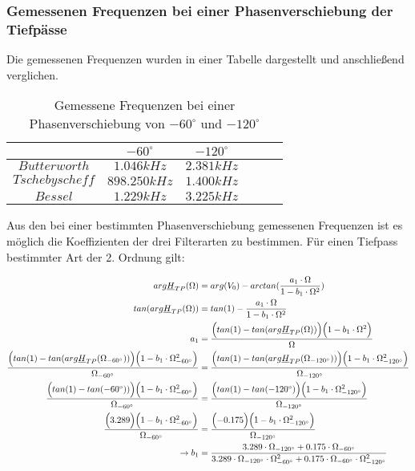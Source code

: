 \newpage

\subsubsection{Gemessenen Frequenzen bei einer Phasenverschiebung der Tiefpässe}
\noindent Die gemessenen Frequenzen wurden in einer Tabelle dargestellt und anschließend verglichen.

		\begin{table}[h]
			\centering
			\begin{tabular}{c|c|c|c|c|c}
				$ $             & $-60^\circ $ & $-120^\circ$  \\
				\hline		
				$Butterworth$   & $1.046kHz$   & $2.381kHz$    \\
				\hline
				$Tschebyscheff$ & $898.250kHz$ & $1.400kHz$    \\ 
				\hline
				$Bessel$        & $1.229kHz$   & $3.225kHz$    \\
			\end{tabular}
			\caption{Gemessene Frequenzen bei einer Phasenverschiebung von $-60^\circ$ und $-120^\circ$ }
			\label{tab:phasenverschiebung_hp_tp_vorausberechnung}
		\end{table}
		
\noindent Aus den bei einer bestimmten Phasenverschiebung gemessenen Frequenzen ist es möglich die Koeffizienten der drei Filterarten zu bestimmen. 
\noindent Für einen Tiefpass bestimmter Art der 2. Ordnung gilt:

\small{
\begin{alignat*}{2}
arg\underline{H}_{TP}(\Omega) &= arg(V_0) - arctan(\frac{a_1 \cdot \Omega}{1-b_1\cdot \Omega^2}) \\
tan(arg\underline{H}_{TP}(\Omega)) &= tan(1) - \frac{a_1 \cdot \Omega}{1-b_1\cdot \Omega^2}\\
a_1 &= \frac{\Bigl(tan(1) - tan(arg\underline{H}_{TP}(\Omega))\Bigr)\Bigl(1-b_1 \cdot \Omega^2\Bigr)}{\Omega}\\
\frac{\Bigl(tan(1) - tan(arg\underline{H}_{TP}(\Omega_{-60^\circ}))\Bigr)\Bigl(1-b_1 \cdot \Omega_{-60^\circ}^2\Bigr)}{\Omega_{-60^\circ}} &= \frac{\Bigl(tan(1) - tan(arg\underline{H}_{TP}(\Omega_{-120^\circ}))\Bigr)\Bigl(1-b_1 \cdot \Omega_{-120^\circ}^2\Bigr)}{\Omega_{-120^\circ}}\\
\frac{\Bigl(tan(1) - tan(-60^\circ))\Bigr)\Bigl(1-b_1 \cdot \Omega_{-60^\circ}^2\Bigr)}{\Omega_{-60^\circ}} &= \frac{\Bigl(tan(1) - tan(-120^\circ)\Bigr)\Bigl(1-b_1 \cdot \Omega_{-120^\circ}^2\Bigr)}{\Omega_{-120^\circ}}\\
\frac{\Bigl( 3.289 \Bigr)\Bigl(1-b_1 \cdot \Omega_{-60^\circ}^2\Bigr)}{\Omega_{-60^\circ}} &= \frac{\Bigl(-0.175\Bigr)\Bigl(1-b_1 \cdot \Omega_{-120^\circ}^2\Bigr)}{\Omega_{-120^\circ}}\\
\rightarrow b_1 &= \frac{3.289\cdot \Omega_{-120^\circ}+0.175\cdot \Omega_{-60^\circ}}
{3.289\cdot \Omega_{-120^\circ}\cdot \Omega_{-60^\circ}^2 +0.175\cdot \Omega_{-60^\circ}\cdot \Omega_{-120^\circ}^2}
\end{alignat*}}

